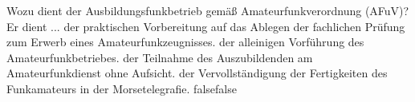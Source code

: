     {Wozu dient der Ausbildungsfunkbetrieb gemäß Amateurfunkverordnung (AFuV)? Er dient ...}
    {der praktischen Vorbereitung auf das Ablegen der fachlichen Prüfung zum Erwerb eines Amateurfunkzeugnisses.}
    {der alleinigen Vorführung des Amateurfunkbetriebes.}
    {der Teilnahme des Auszubildenden am Amateurfunkdienst ohne Aufsicht.}
    {der Vervollständigung der Fertigkeiten des Funkamateurs in der Morsetelegrafie.}
    {false}{false}